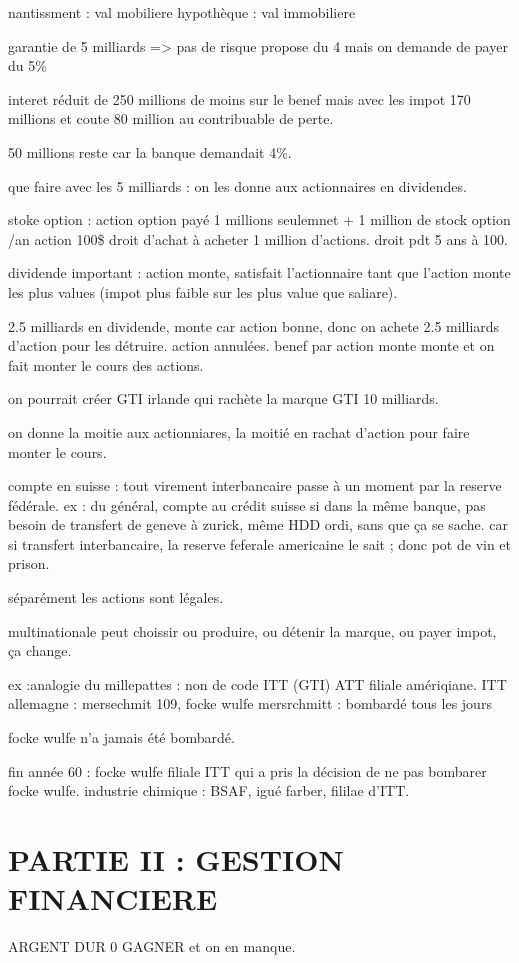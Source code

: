 \documentclass[a4paper,12pt]{article}
\begin{document}
nantissment : val mobiliere 
hypothèque : val immobiliere

garantie de 5 milliards => pas de risque
propose du 4 mais on demande de payer du  5\%

interet réduit de 250 millions de moins sur le benef
mais avec les impot 170 millions et coute 80 million au contribuable de perte.

50 millions reste car la banque demandait 4\%.

que faire avec les 5 milliards : on les donne aux actionnaires en dividendes. 

stoke option : action option payé 1 millions seulemnet + 1 million de stock option /an
action 100\$  droit d'achat à acheter 1 million d'actions. droit pdt 5 ans à 100.

dividende important : action monte, satisfait l'actionnaire
tant que l'action monte les plus values (impot plus faible sur les plus value que saliare).

2.5 milliards en dividende, monte car action bonne, donc on achete 2.5 milliards d'action pour les détruire.
action annulées. benef par action monte monte et on fait monter le cours des actions.


on pourrait créer GTI irlande qui rachète la marque GTI 10 milliards.

on donne la moitie aux actionniares, la moitié en rachat d'action pour faire monter le cours.

compte en suisse : tout virement interbancaire passe à un moment par la reserve fédérale.
ex : du général, compte au crédit suisse 
si dans la même banque, pas besoin de transfert de geneve à zurick, même HDD ordi, sans que ça se sache.
car si transfert interbancaire, la reserve feferale americaine le sait ; donc pot de vin et prison.


séparément les actions sont légales.

multinationale peut choissir ou produire, ou détenir la marque, ou payer impot, ça change.

ex :analogie du millepattes  : non de code ITT (GTI)  ATT filiale amériqiane.
ITT allemagne : mersechmit 109, focke wulfe
mersrchmitt : bombardé tous les jours

focke wulfe n'a jamais été bombardé.

fin année 60 : focke wulfe filiale ITT
qui a pris la décision de ne pas bombarer focke wulfe.
industrie chimique : BSAF, igué farber, fililae d'ITT.




\section{PARTIE II : GESTION FINANCIERE}
  ARGENT DUR 0 GAGNER et on en manque.
  
\end{document}
